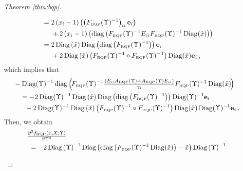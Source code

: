 \documentclass[smallextended]{svjour3hack}       %
\DeclareMathOperator{\Diag}{Diag}
\DeclareMathOperator{\diag}{diag}
\begin{document}
\begin{proof}[Theorem \ref{thm:bqp}]
\begin{itemize}
\begin{align*}
     & ~=2\left(x_i-1\right)\left( \left(F_{{\tiny\mbox{BQP}}}(\Upsilon)^{-1}\right)_{ii} \mathbf{e}_i\right)\\
     &~~ \quad + 2\left(x_i-1\right)\left(\diag\left(F_{{\tiny\mbox{BQP}}}(\Upsilon)^{-1}E_{ii} F_{{\tiny\mbox{BQP}}}(\Upsilon)^{-1}\Diag(\check{x})\right)\right)\\
     & ~=2 \Diag\left(\check{x}\right) \Diag\left(\diag\left(F_{{\tiny\mbox{BQP}}}(\Upsilon)^{-1}\right)\right) \mathbf{e}_i\\
     &~~  \quad +2 \Diag\left(\check{x}\right)   \left(F_{{\tiny\mbox{BQP}}}(\Upsilon)^{-1}\circ F_{{\tiny\mbox{BQP}}}(\Upsilon)^{-1}\right) \Diag(\check{x}) \mathbf{e}_i\,,
 \end{align*}
    which implies that
    \begin{align*}
    & - \Diag(\Upsilon)^{-1}\diag\left(\!F_{{\tiny\mbox{BQP}}}(\Upsilon)^{-1}\textstyle\frac{\left(E_{ii}A_{{\tiny\mbox{BQP}}}(\Upsilon)+A_{{\tiny\mbox{BQP}}}(\Upsilon) E_{ii}\right)}{\gamma_i}
  F_{{\tiny\mbox{BQP}}}(\Upsilon)^{-1}\Diag(\check{x})\!\right)\\
    & ~~~=-2 \Diag(\Upsilon)^{-1} \Diag\left(\check{x}\right) \Diag\left(\diag\left(F_{{\tiny\mbox{BQP}}}(\Upsilon)^{-1}\right)\right) \Diag(\Upsilon)^{-1}\mathbf{e}_i \\
    & ~~ \quad - 2 \Diag(\Upsilon)^{-1} \Diag\left(\check{x}\right)   \left(F_{{\tiny\mbox{BQP}}}(\Upsilon)^{-1}\circ F_{{\tiny\mbox{BQP}}}(\Upsilon)^{-1}\right) \Diag(\check{x})\Diag(\Upsilon)^{-1}\mathbf{e}_i\,.
    \end{align*}
   Then, we obtain
    \begin{align*}
        &\textstyle\frac{\partial^2 f_{{\tiny\mbox{BQP}}}\left(x,X;\Upsilon\right)}{\partial \Upsilon ^2 }\\
        &  ~=- 2 \Diag\left(\Upsilon\right)^{-1} \Diag\left(\diag\left(F_{{\tiny\mbox{BQP}}}(\Upsilon)^{-1}\Diag(\check{x})\right)-\check{x}\right) \Diag\left(\Upsilon\right)^{-1}   \\

\end{align*}
\end{itemize}
\end{proof}
\end{document}
